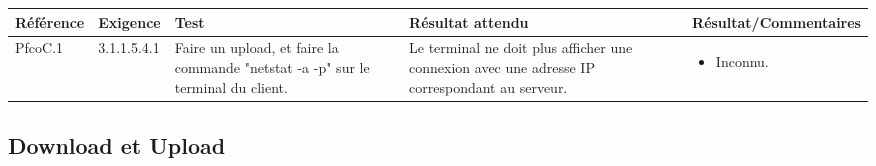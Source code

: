 \documentclass[10pt,a4paper,landscape]{report}
\begin{document}
\begin{center}
	\bgroup
	\def\arraystretch{1.5}
	\begin{tabular}{|p{2.5cm}|p{2cm}|p{8cm}|p{8cm}|p{5cm}|}
		\hline
		\rowcolor{gris}Référence & Exigence & Test & Résultat attendu & Résultat/Commentaires\\
		\hline
		PfcoC.1 & 3.1.1.5.4.1 & Faire un upload, et faire la commande "netstat -a -p" sur le terminal du client. & Le terminal ne doit plus afficher une connexion avec une adresse IP correspondant au serveur.&\vspace*{-0.2cm} \begin{itemize}[label=$\ast$] \item \textcolor{ukwn}{Inconnu.}\end{itemize} \\
		\hline
	\end{tabular}
	\egroup
\end{center}

\subsection{Download et Upload}
\end{document}

